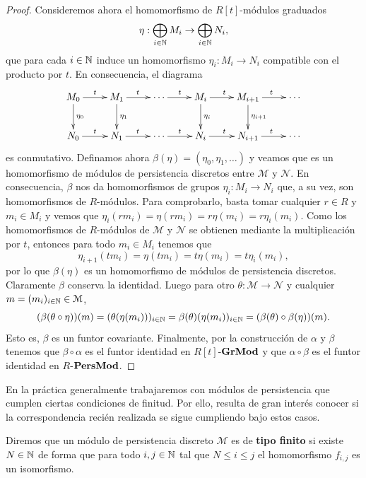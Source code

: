 \begin{proof}
	Consideremos ahora el homomorfismo de $R[t]$-módulos graduados
	\[
	\eta : \bigoplus_{i \in \mathbb{N}}M_{i} \to \bigoplus_{i \in \mathbb{N}}N_{i},
	\]
	que para cada $i \in \mathbb{N}$ induce un homomorfismo $\eta_{i} : M_{i} \to N_{i}$
	compatible con el producto por $t$. En consecuencia, el diagrama
	\[
	\xymatrix{ M_0 \ar@{->}[r]^{t} \ar@{->}[d]^{\eta_0} & M_1 \ar@{->}[r]^{t} \ar@{->}[d]^{\eta_1} & \cdots \ar@{->}[r]^{t} & M_i \ar@{->}[r]^{t} \ar@{->}[d]^{\eta_i} & M_{i+1} \ar@{->}[r]^{t} \ar@{->}[d]^{\eta_{i+1}} & \cdots \\ N_0 \ar@{->}[r]^{t} & N_1 \ar@{->}[r]^{t} & \cdots \ar@{->}[r]^{t} & N_i \ar@{->}[r]^{t} & N_{i+1} \ar@{->}[r]^{t} & \cdots }
	\]
	es conmutativo. Definamos ahora $\beta(\eta) = (\eta_{0}, \eta_{1}, \ldots)$ y
	veamos que es un homomorfismo de módulos de persistencia discretos entre $\mathcal{M}$
	y $\mathcal{N}$. En consecuencia, $\beta$ nos da homomorfismos de grupos $\eta_{i}
	: M_{i} \to N_{i}$ que, a su vez, son homomorfismos de $R$-módulos. Para
	comprobarlo, basta tomar cualquier $r \in R$ y $m_{i} \in M_{i}$ y vemos que $\eta
	_{i}(rm_{i}) = \eta(rm_{i}) = r \eta(m_{i}) = r \eta_{i}(m_{i})$. Como los
	homomorfismos de $R$-módulos de $\mathcal{M}$ y $\mathcal{N}$ se obtienen
	mediante la multiplicación por $t$, entonces para todo $m_{i} \in M_{i}$ tenemos
	que
	\[
	\eta_{i+1}(tm_{i}) = \eta(tm_{i}) = t\eta(m_{i}) = t \eta_{i}(m_{i}),
	\]
	por lo que $\beta(\eta)$ es un homomorfismo de módulos de persistencia discretos.
	Claramente $\beta$ conserva la identidad. Luego para otro $\theta : \mathcal{M}
	\to \mathcal{N}$ y cualquier $m=(m_{i})_{i \in \mathbb{N}}\in \mathcal{M}$,
	\[
	(\beta(\theta \circ \eta))(m) = (\theta(\eta(m_{i})))_{i \in \mathbb{N}}= \beta(\theta
	)(\eta(m_{i}))_{i \in \mathbb{N}}= (\beta(\theta) \circ \beta(\eta))(m).
	\]
	Esto es, $\beta$ es un funtor covariante. Finalmente, por la construcción de $\alpha$
	y $\beta$ tenemos que $\beta \circ \alpha$ es el funtor identidad en $R[t]$-$\mathbf{GrMod}$ y que $\alpha \circ \beta$ es el funtor identidad en $R$-$\mathbf{PersMod}$.
\end{proof}

En la práctica generalmente trabajaremos con módulos de persistencia que cumplen
ciertas condiciones de finitud. Por ello, resulta de gran interés conocer si la correspondencia
recién realizada se sigue cumpliendo bajo estos casos.

\begin{definicion}
	Diremos que un módulo de persistencia discreto $\mathcal{M}$ es de \textbf{tipo
		finito} si existe $N \in \mathbb{N}$ de forma que para todo $i,j \in \mathbb{N}$ tal que
	$N \leq i \leq j$ el homomorfismo $f_{i,j}$ es un isomorfismo.
\end{definicion}

